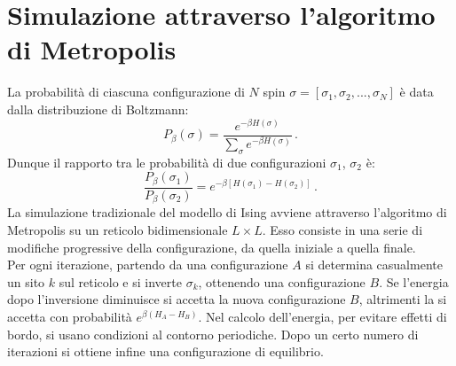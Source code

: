 \documentclass[Lau, noexaminfo, oneside]{sapthesis} %
\begin{document}
\section{Simulazione attraverso l'algoritmo di Metropolis}
La probabilità di ciascuna configurazione di $N$ spin $\sigma = [\sigma_1, \sigma_2, ..., \sigma_N]$ è data dalla distribuzione di Boltzmann:
\begin{equation}
P_{\beta }(\sigma)={\frac {e^{-\beta H(\sigma )}}{\sum\limits_{\sigma} e^{-\beta H(\sigma )}}} \,.
\end{equation}
Dunque il rapporto tra le probabilità di due configurazioni $\sigma_1$, $\sigma_2$ è:
\begin{equation}
\frac{P_{\beta }(\sigma_1)}{P_{\beta }(\sigma_2)} = e^{-\beta [H(\sigma_1) - H(\sigma_2)]} \,.
\end{equation}
La simulazione tradizionale del modello di Ising avviene attraverso l'algoritmo di Metropolis su un reticolo bidimensionale $L \times L$.
Esso consiste in una serie di modifiche progressive della configurazione, da quella iniziale a quella finale. \\Per ogni iterazione, partendo da una configurazione $A$ si determina casualmente un sito $k$ sul reticolo e si inverte $\sigma_k$, ottenendo una configurazione $B$. Se l'energia dopo l'inversione diminuisce si accetta la nuova configurazione $B$, altrimenti la si accetta con probabilità $e^{\beta (H_A - H_B)}$. Nel calcolo dell'energia, per evitare effetti di bordo, si usano condizioni al contorno periodiche. Dopo un certo numero di iterazioni si ottiene infine una configurazione di equilibrio. \cite{metropolis-hastings}
\end{document}
